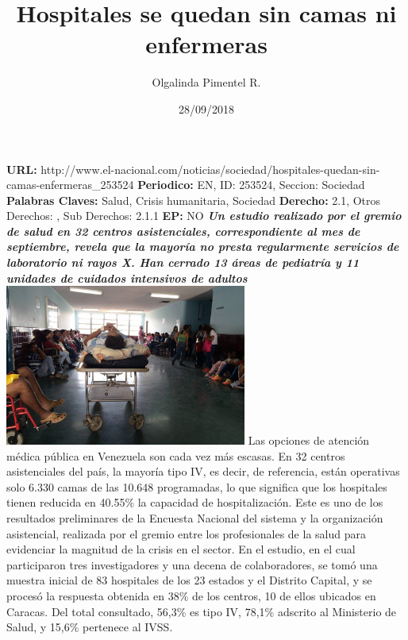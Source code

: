 \documentclass{article}%
\title{\textbf{Hospitales se quedan sin camas ni enfermeras}}%
\author{Olgalinda Pimentel R.}%
\date{28/09/2018}%
\begin{document}
%
\normalsize%
\maketitle%
\textbf{URL: }%
http://www.el{-}nacional.com/noticias/sociedad/hospitales{-}quedan{-}sin{-}camas{-}enfermeras\_253524\newline%
%
\textbf{Periodico: }%
EN, %
ID: %
253524, %
Seccion: %
Sociedad\newline%
%
\textbf{Palabras Claves: }%
Salud, Crisis humanitaria, Sociedad\newline%
%
\textbf{Derecho: }%
2.1, %
Otros Derechos: %
, %
Sub Derechos: %
2.1.1\newline%
%
\textbf{EP: }%
NO\newline%
\newline%
%
\textbf{\textit{Un estudio realizado por el gremio de salud en 32 centros asistenciales, correspondiente al mes de septiembre, revela que la mayoría no presta regularmente servicios de laboratorio ni rayos X. Han cerrado 13 áreas de pediatría y 11 unidades de cuidados intensivos de adultos ~}}%
\newline%
\newline%
%
\includegraphics[width=300px]{118.jpg}%
\newline%
%
Las opciones de atención médica pública en Venezuela son cada vez más escasas. En 32 centros asistenciales del país, la mayoría tipo IV, es decir, de referencia, están operativas solo 6.330 camas de las 10.648 programadas, lo que significa que los hospitales tienen reducida en 40.55\% la capacidad de hospitalización.%
\newline%
%
Este es uno de los resultados preliminares de la Encuesta Nacional del sistema y la organización asistencial, realizada por el gremio entre los profesionales de la salud para evidenciar la magnitud de la crisis en el sector. En el estudio, en el cual participaron tres investigadores y una decena de colaboradores, se tomó una muestra inicial de 83 hospitales de los 23 estados y el Distrito Capital, y se procesó la respuesta obtenida en 38\% de los centros, 10 de ellos ubicados en Caracas. Del total consultado, 56,3\% es tipo IV, 78,1\% adscrito al Ministerio de Salud, y 15,6\% pertenece al IVSS.%
\end{document}
